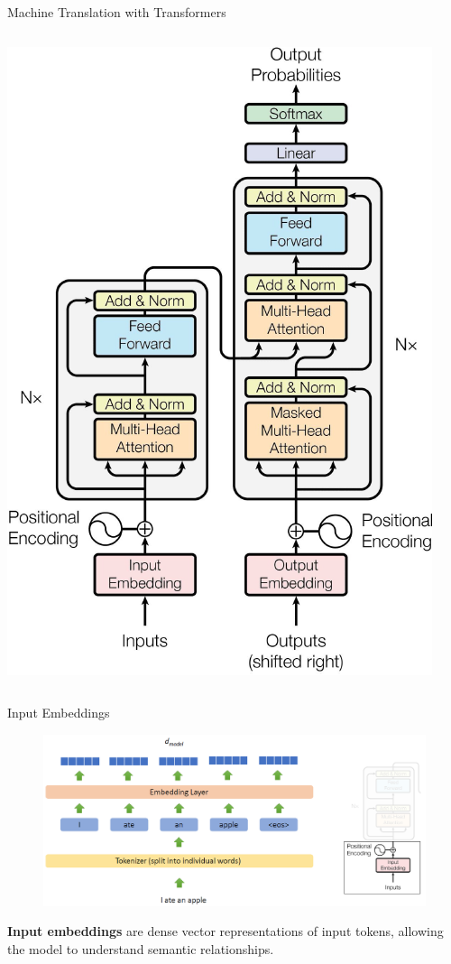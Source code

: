 \begin{frame}[allowframebreaks]{Machine Translation with Transformers}
\begin{columns}
\begin{column}{0.5\textwidth}
            \includegraphics[width=\linewidth, height=0.9\textheight,keepaspectratio]{images/nlp/transformer-architecture.png}
        \end{column}
    \end{columns}
\end{frame}

\begin{frame}{Input Embeddings}
    \begin{figure}
        \centering
        \includegraphics[width=\linewidth, height=0.9\textheight,keepaspectratio]{images/nlp/input-embeddings.png}
    \end{figure}

    \textbf{Input embeddings} are dense vector representations of input tokens, allowing the model to understand semantic relationships.
\end{frame}


